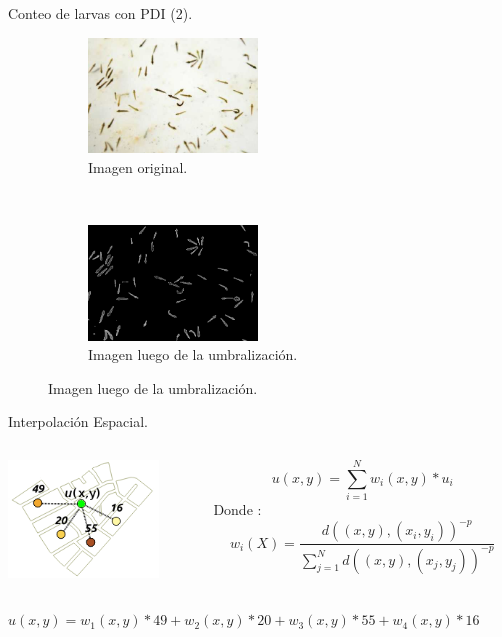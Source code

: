 \begin{frame}[c]{Conteo de larvas con PDI (2).}
    \begin{figure}
    \begin{subfigure}[t]{0.45\textwidth}
        \includegraphics[width=4.5cm]{../book/capitulo-5/graphics/larvas-original.png}
        \caption{Imagen original.}
    \end{subfigure}
    ~~~~
    \begin{subfigure}[t]{0.45\textwidth}
        \includegraphics[width=4.5cm]{../book/capitulo-5/graphics/larvas-otsu.png}
        \caption{Imagen luego de la umbralización.}
    \end{subfigure}
    \end{figure}
\end{frame}

\begin{frame}[t]{Interpolación Espacial.}
  \begin{center}
   \begin{columns}[T]
        \begin{column}[T]{3.5cm}
            \includegraphics[width=4cm]{./graphics/interpolacion-ej.png}
        \end{column}
        \begin{column}[T]{7cm}
        \begin{equation}\label{eq:interpolacion-idw}
         u(x,y) = \sum_{i=1}^{N} w_i(x,y) * u_{i}
        \end{equation}
        Donde :
        \begin{equation}
        w_i(X) =  \dfrac{d((x,y), (x_i,y_i))^{-p}}{\sum_{j=1}^{N} d((x,y), (x_j,y_j))^{-p}}
        \end{equation}
        \end{column}
    \end{columns}
  \end{center}
    $u(x,y) = w_1(x,y) * 49 + w_2(x,y) * 20 + w_3(x,y) * 55 + w_4(x,y) * 16 $
\end{frame}

